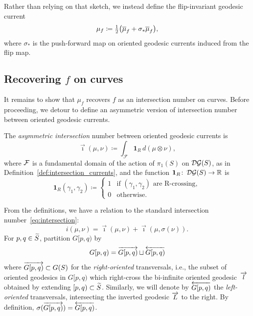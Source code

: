 Rather than relying on that sketch, we instead define the
flip-invariant geodesic current
\begin{equation}
\label{eq:flip-invariant}
\mu_f\coloneqq{\textstyle \frac{1}{2}}\bigl(\overline\mu_f+\sigma_*\overline\mu_f\bigr),
\end{equation}
where $\sigma_*$ is the push-forward map on oriented geodesic currents
induced from the flip map.

\subsection{Recovering \texorpdfstring{$f$}{f} on curves}
\label{sec:recovery}

It remains to show that $\mu_f$ recovers $f$ as an intersection number on curves.
Before proceeding, we detour to define an asymmetric version of intersection
number between oriented geodesic currents.
\begin{definition}\label{def:asymmetric}
  The \emph{asymmetric intersection} number between oriented geodesic currents is
\begin{equation}
\vec{\imath}(\mu,\nu) \coloneqq \int_{\mathcal{F}} \mathbf{1}_R \, d(\mu \otimes \nu),
\label{eq:asymmetric}
\end{equation}
where $\mathcal{F}$ is a fundamental domain of the action of $\pi_1(S)$ on
$\operatorname{\mathcal{D}\mathcal{G}}(S)$, as in Definition~\ref{def:intersection_currents}, and
the function $\mathbf{1}_R \colon \operatorname{\mathcal{D}\mathcal{G}}(S) \to \mathbb{R}$ is
\[
\mathbf{1}_R(\gamma_1,\gamma_2) \coloneqq
\begin{cases}
1 & \text{if } (\gamma_1,\gamma_2)\text{ are R-crossing},\\
0 & \text{otherwise}.
\end{cases}
\]
\end{definition}
From the definitions, we have a relation to the standard intersection
number~\eqref{eq:intersection}:
\begin{equation}
i(\mu, \nu) = \vec{\imath}(\mu, \nu) + \vec{\imath}(\mu, \sigma(\nu)).
\label{eq:relation_intersections}
\end{equation}
For $p,q \in \widetilde{S}$, partition $G[p,q)$ by
\begin{equation}\label{eq:partition_oriented}
G[p,q) = \overrightarrow{G[p,q)} \sqcup \overleftarrow{G[p,q)} 
\end{equation}
where $\overrightarrow{G[p,q)}\subset G(S)$ for the \emph{right-oriented} transversals, i.e., the subset of
oriented geodesics in $G[p,q)$ which right-cross the bi-infinite
oriented geodesic~$\overrightarrow{l}$ obtained by extending $[p,q) \subset
\widetilde{S}$. Similarly, we will denote by $\overleftarrow{G[p,q)}$ the
\emph{left-oriented} transversals, intersecting the inverted geodesic
$\overrightarrow{L}$ to the right. By definition, $\sigma(\overrightarrow{G[p,q)})= \overleftarrow{G[p,q)}$.

